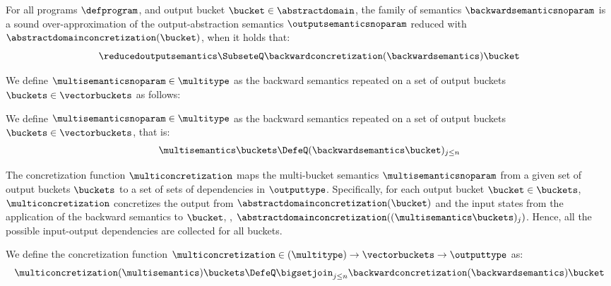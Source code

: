 
\begin{definition}
  For all programs $\defprogram$, and output bucket $\bucket\in\abstractdomain$, the family of semantics $\backwardsemanticsnoparam$ is a \textup{sound over-approximation} of the output-abstraction semantics $\outputsemanticsnoparam$ reduced with  $\abstractdomainconcretization(\bucket)$, when it holds that:
  \[\reducedoutputsemantics \SubseteQ \backwardconcretization(\backwardsemantics)\bucket\]
\end{definition}

We define
$\multisemanticsnoparam\in\multitype$ as the backward semantics repeated on a set of output buckets $\buckets\in\vectorbuckets$ as follows:

\begin{definition}
  We define
$\multisemanticsnoparam\in\multitype$ as the backward semantics repeated on a set of output buckets $\buckets\in\vectorbuckets$, that is:
\begin{align*}
\multisemantics\buckets \DefeQ (\backwardsemantics\bucket)_{j\le n}
\end{align*}
\end{definition}


The concretization function $\multiconcretization$ maps the multi-bucket semantics $\multisemanticsnoparam$ from a given set of output buckets $\buckets$ to a set of sets of dependencies in $\outputtype$.
Specifically, for each output bucket $\bucket\in\buckets$, $\multiconcretization$ concretizes the output from $\abstractdomainconcretization(\bucket)$ and the input states from the application of the backward semantics to $\bucket$, \ie, $\abstractdomainconcretization((\multisemantics\buckets)_j)$.
Hence, all the possible input-output dependencies are collected for all buckets.
\begin{definition}
  We define the concretization function $\multiconcretization\in(\multitype)\to\vectorbuckets\to\outputtype$ as:
\begin{gather*}
  \multiconcretization(\multisemantics)\buckets \DefeQ
  \bigsetjoin_{j\le n} \backwardconcretization(\backwardsemantics)\bucket
\end{gather*}
\end{definition}

